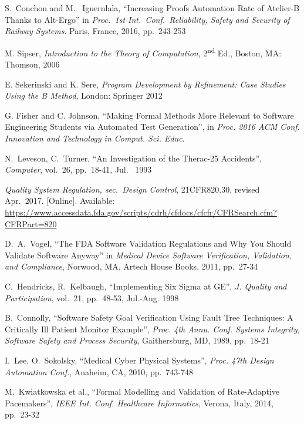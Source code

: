 \documentclass[12pt,journal,duplex]{IEEEtran}
\begin{document}
	\begin{thebibliography}{2}
		S.~Conchon and M.~ Iguernlala, ``Increasing Proofs Automation Rate of Atelier-B Thanks to Alt-Ergo'' in \emph{Proc.~1st Int.~Conf.~Reliability, Safety and Security of Railway Systems}. Paris, France, 2016, pp.~243-253

		M. Sipser, \emph{Introduction to the Theory of Computation}, 2\textsuperscript{nd} Ed., Boston, MA: Thomson, 2006

		E. Sekerinski and K. Sere, \emph{Program Development by Refinement: Case Studies Using the B Method}, London: Springer 2012

		G. Fisher and C. Johnson, ``Making Formal Methods More Relevant to Software Engineering Students via Automated Test Generation'', in \emph{Proc. 2016 ACM Conf. Innovation and Technology in Comput. Sci. Educ.}

		N.~Leveson, C.~Turner, ``An Investigation of the Therac-25 Accidents'', \emph{Computer}, vol.~26, pp.~18-41, Jul.~ 1993

		\emph{Quality System Regulation, sec.~Design Control}, 21CFR820.30, revised Apr.~2017. [Online]. Available:
		\url{https://www.accessdata.fda.gov/scripts/cdrh/cfdocs/cfcfr/CFRSearch.cfm?CFRPart=820}

		D.~A.~Vogel, ``The FDA Software Validation Regulations and Why You Should Validate Software Anyway'' in \emph{Medical Device Software Verification, Validation, and Compliance}, Norwood, MA, Artech House Books, 2011, pp.~27-34

		C.~Hendricks, R.~Kelbaugh, ``Implementing Six Sigma at GE'', \emph{J. Quality and Participation}, vol.~21, pp.~48-53, Jul.-Aug. 1998

		B.~Connolly, ``Software Safety Goal Verification Using Fault Tree Techniques: A Critically Ill Patient Monitor Example'', \emph{Proc. 4th Annu. Conf. Systems Integrity, Software Safety and Process Security}, Gaithersburg, MD, 1989, pp.~18-21

		I.~Lee, O.~Sokolsky, ``Medical Cyber Physical Systems'', \emph{Proc. 47th Design Automation Conf.}, Anaheim, CA, 2010, pp.~743-748

		M.~Kwiatkowska et al., ``Formal Modelling and Validation of Rate-Adaptive Pacemakers'', \emph{IEEE Int. Conf. Healthcare Informatics}, Verona, Italy, 2014, pp.~23-32


\end{thebibliography}
\end{document}
